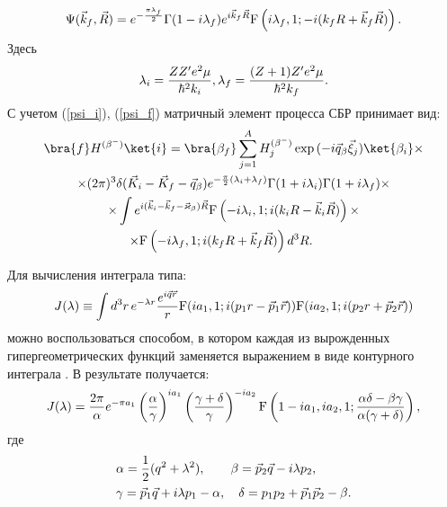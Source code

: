 \begin{eqnarray}\label{psi_f}
\Psi (\vec k_f, \vec R)=e^{-{\pi \lambda_f\over2}} \Gamma(1-i\lambda_f)
e^{i \vec k_f \vec R} {\rm F} \left(i \lambda_f,1;-i(k_f R + \vec k_f \vec R)\right).
\end{eqnarray}
Здесь
\begin{eqnarray}
\lambda_i = {Z Z' e^2 \mu\over \hbar^2 k_i},
\lambda_f = {(Z+1) Z' e^2 \mu\over \hbar^2 k_f}.
\end{eqnarray}
С учетом (\ref{psi_i}), (\ref{psi_f}) матричный элемент процесса СБР принимает вид:
\begin{multline}\label{pred_mat}
\bra{f} H^{(\beta^-)}\ket{i}= \bra{\beta_f }
\sum_{j=1}^A H^{(\beta^-)}_{j}\exp{(-i\vec q_\beta\vec\xi_{j})}
\ket{ \beta_i}\times \\
\times(2\pi)^3 \delta (\vec K_i - \vec K_f - \vec q_\beta)
e^{-{\pi\over 2} (\lambda_i + \lambda_f)} \Gamma{(1+i\lambda_i)}
\Gamma{(1+i\lambda_f)}\times\\
\times\int e^{i(\vec k_i - \vec k_f - \vec \varkappa_\beta)\vec R}
{\rm F} \left(-i \lambda_i,1;i(k_i R - \vec k_i \vec R)\right)\times\\
\times{\rm F} \left(-i \lambda_f,1;i(k_f R + \vec k_f \vec R)\right) d^3 R .\qquad
\end{multline}

Для вычисления интеграла типа:
\begin{equation}\label{def_J}
J(\lambda)\equiv\int d^3 r\, e^{-\lambda r} {e^{i\vec q \vec r}\over r}
{\rm F} (i a_1,1;i(p_1 r - \vec p_1 \vec r))
{\rm F} (i a_2,1;i(p_2 r + \vec p_2 \vec r))
\end{equation}
можно воспользоваться способом, в котором каждая из вырожденных гипергеометрических функций
заменяется выражением в виде контурного интеграла \cite{nord, bess}. В результате
получается:
\begin{equation}\label{rez_J}
J(\lambda)={{2\pi}\over\alpha} e^{-\pi a_1}\left({\alpha\over\gamma}\right)^{i a_1}
\left({{\gamma+\delta}\over\gamma}\right)^{-i a_2}{\rm F}\left(1-i a_1, i a_2,
1;{{\alpha\delta-\beta\gamma}\over{\alpha(\gamma+\delta)}}\right),
\end{equation}
где
\begin{equation*}
\begin{split}
&\alpha={1\over2}(q^2+\lambda^2),\qquad \beta=\vec p_2 \vec q - i \lambda p_2,
\\
&\gamma=\vec p_1 \vec q + i \lambda p_1 - \alpha, \quad \delta=p_1 p_2+
\vec p_1 \vec p_2 -\beta.
\end{split}
\end{equation*}


